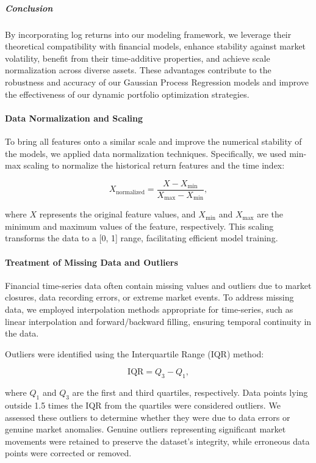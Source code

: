 \subparagraph{Conclusion}

By incorporating log returns into our modeling framework, we leverage their theoretical compatibility with financial models, enhance stability against market volatility, benefit from their time-additive properties, and achieve scale normalization across diverse assets. These advantages contribute to the robustness and accuracy of our Gaussian Process Regression models and improve the effectiveness of our dynamic portfolio optimization strategies.



\paragraph{Data Normalization and Scaling}

To bring all features onto a similar scale and improve the numerical stability of the models, we applied data normalization techniques. Specifically, we used min-max scaling to normalize the historical return features and the time index:

\begin{equation}
    X_{\text{normalized}} = \frac{X - X_{\text{min}}}{X_{\text{max}} - X_{\text{min}}},
\end{equation}

where $X$ represents the original feature values, and $X_{\text{min}}$ and $X_{\text{max}}$ are the minimum and maximum values of the feature, respectively. This scaling transforms the data to a [0, 1] range, facilitating efficient model training.

\paragraph{Treatment of Missing Data and Outliers}

Financial time-series data often contain missing values and outliers due to market closures, data recording errors, or extreme market events. To address missing data, we employed interpolation methods appropriate for time-series, such as linear interpolation and forward/backward filling, ensuring temporal continuity in the data.

Outliers were identified using the Interquartile Range (IQR) method:

\begin{equation}
    \text{IQR} = Q_3 - Q_1,
\end{equation}

where $Q_1$ and $Q_3$ are the first and third quartiles, respectively. Data points lying outside 1.5 times the IQR from the quartiles were considered outliers. We assessed these outliers to determine whether they were due to data errors or genuine market anomalies. Genuine outliers representing significant market movements were retained to preserve the dataset's integrity, while erroneous data points were corrected or removed.

